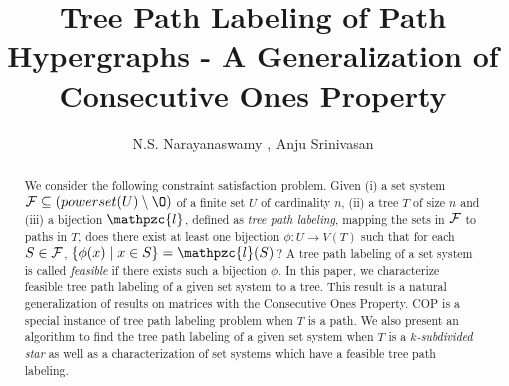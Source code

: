 \documentclass{fsttcs}
\def\cF{{\cal F}}
\def\F{{\mathcal F}}
\def\cl{\mathpzc{l}}
\begin{document}



\title{Tree Path Labeling of Path Hypergraphs - A Generalization of
  Consecutive Ones Property}


\author{N.S. Narayanaswamy , Anju Srinivasan }




\begin{abstract}
  We consider the following constraint satisfaction problem. Given (i)
  a
  set system $\F \subseteq (powerset(U) \setminus \O)$ of a finite
  set $U$ of cardinality $n$, (ii) a tree 
  $T$ of size $n$ and (iii) a bijection $\cl$, defined as {\em tree
    path labeling}, mapping the sets in $\cF$ to 
  paths in $T$, does there exist at least one bijection 
  $\phi:U \rightarrow 
   V(T)$ such that for each $S \in \cF$, $\{\phi(x) \mid x \in S\} =
   \cl(S)$?  A tree path labeling of a set system is called {\em
     feasible} if there exists such 
  a bijection $\phi$.  In this paper, we characterize feasible tree
  path labeling of a given set system to a tree.  This result is a
  natural generalization of results on matrices with the Consecutive
  Ones Property. COP is a special instance of tree path labeling
  problem when $T$ is a path.  We also
  present an algorithm to find the tree path labeling of a given
  set system when $T$ is a {\em $k$-subdivided star} as well as a
  characterization of set systems which have a 
  feasible tree path labeling. 
\end{abstract}
\end{document}
